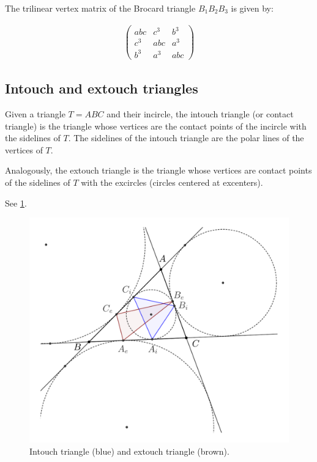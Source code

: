 The trilinear vertex matrix of the Brocard triangle $B_1B_2B_3$ is given by:

\begin{align*}
   \left(\begin{matrix} abc& c^3& b^3\\
   c^3&abc & a^3\\
   b^3 &a^3 &abc\end{matrix}\right)
\end{align*}

\subsection{Intouch and extouch triangles}

Given a triangle $T=ABC$ and their incircle,  the intouch triangle (or contact triangle) is the triangle  whose vertices are the contact points of the incircle with the sidelines of $T$. The sidelines of the intouch triangle are the polar lines of the vertices of $T$.

Analogously, the extouch triangle is the triangle whose vertices are   contact points of the sidelines of $T$ with the excircles (circles centered at excenters).

 See \cref{fig:appA-intouch-extouch}.
 \begin{figure}[H]
     \centering
      \includegraphics[scale=0.4]{zappA/pics/pics-appA-intouch-extouch.pdf}
    \caption{Intouch triangle (blue) and extouch triangle (brown).}
    \label{fig:appA-intouch-extouch}
\end{figure}

